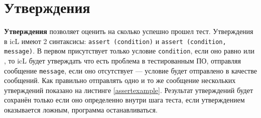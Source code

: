 \section{Утверждения}

{\bf Утверждения} позволяет оценить на сколько успешно прошел тест. Утверждения в icL имеют 2 синтаксисы: \texttt{assert (condition)} и \texttt{assert (condition, message)}. В первом присутствует только условие \texttt{condition}, если оно равно \false{} или \void, то icL будет утверждать что есть проблема в тестированным ПО, отправляя сообщение \texttt{message}, если оно отсутствует — условие будет отправлено в качестве сообщений. Как правильно отправлять одно и то же сообщение нескольких утверждений показано на листинге \ref{assertexample}. Результат утверждений будет сохранён только если оно определенно внутри шага теста, если утверждением оказывается ложным, программа останавливаться.

\begin{sourcecode}
	\label{assertexample}
    \inputminted[linenos]{icl}{../sources/assertexample.icL}
\end{sourcecode}


